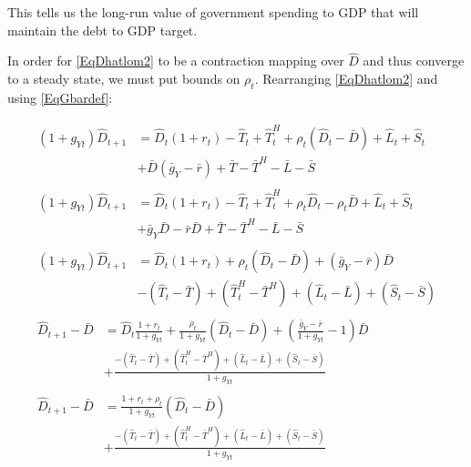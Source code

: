       This tells us the long-run value of government spending to GDP that will maintain the debt to GDP target.

      In order for \eqref{EqDhatlom2} to be a contraction mapping over $\hat D$ and thus converge to a steady state, we must put bounds on $\rho_t$.  Rearranging \eqref{EqDhatlom2} and using \eqref{EqGbardef}:

      \begin{align}
        \begin{split}
        (1+g_{Yt}) \hat D_{t+1} & = \hat D_t (1+r_t) - \hat T_t + \hat T^H_t + \rho_t (\hat D_t - \bar D) + \hat L_t + \hat S_t \\
        & + \bar D(\bar g_{Y} - \bar r) + \bar T - \bar T^H - \bar L - \bar S
        \end{split} \nonumber \\
        \begin{split}
        (1+g_{Yt}) \hat D_{t+1} & = \hat D_t (1+r_t) - \hat T_t + \hat T^H_t + \rho_t \hat D_t - \rho_t \bar D + \hat L_t + \hat S_t \\
        & + \bar g_Y \bar D - \bar r \bar D + \bar T - \bar T^H - \bar L - \bar S
        \end{split} \nonumber \\
        \begin{split}
        (1+g_{Yt}) \hat D_{t+1} & =  \hat D_t (1+r_t) + \rho_t (\hat D_t -\bar D) + (\bar g_Y - \bar r ) \bar D \\
        & - (\hat T_t - \bar T) + (\hat T^H_t -\bar T^H) + (\hat L_t -\bar L) + (\hat S_t -\bar S)
        \end{split} \nonumber \\
        \begin{split}
        \hat D_{t+1} - \bar D & = \hat D_t \frac{1+r_t}{1+g_{Yt}} + \frac{\rho_t}{1+g_{Yt}} (\hat D_t -\bar D) + \left( \frac{\bar g_Y - \bar r}{1+g_{Yt}} - 1 \right) \bar D \\
        & + \frac{-(\hat T_t - \bar T) + (\hat T^H_t -\bar T^H) + (\hat L_t -\bar L) + (\hat S_t -\bar S)}{1+g_{Yt}}
        \end{split}  \nonumber \\
        \begin{split} 
        \hat D_{t+1} - \bar D & = \frac{1+r_t+\rho_t}{1+g_{Yt}} (\hat D_t -\bar D) \\
        & + \frac{-(\hat T_t - \bar T) + (\hat T^H_t -\bar T^H) + (\hat L_t -\bar L) + (\hat S_t -\bar S)}{1+g_{Yt}}
        \end{split} 
        \label{EqStab}
      \end{align}

